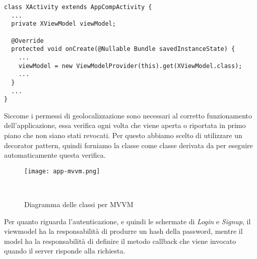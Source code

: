 \documentclass[../../manuale-sviluppatore.tex]{subfiles}
\begin{document}
\begin{verbatim}
class XActivity extends AppCompActivity {
  ...
  private XViewModel viewModel;

  @Override
  protected void onCreate(@Nullable Bundle savedInstanceState) {
    ...
    viewModel = new ViewModelProvider(this).get(XViewModel.class);
    ...
  }
  ...
}
\end{verbatim}

Siccome i permessi di geolocalizzazione sono necessari al corretto funzionamento dell'applicazione, essa verifica ogni volta che viene aperta o riportata in primo piano che non siano stati revocati.
Per questo abbiamo scelto di utilizzare un decorator pattern, quindi forniamo la classe  come classe derivata da  per eseguire automaticamente questa verifica.

\begin{figure}[h]
  \centering
  \texttt{[image: app-mvvm.png]}
  \caption{Diagramma delle classi per MVVM}
~~\label{fig:app/diagramma_classi_mvvm}
\end{figure}

Per quanto riguarda l'autenticazione, e quindi le schermate di \textit{Login} e \textit{Signup}, il viewmodel ha la responsabilità di produrre un hash della password, mentre il model ha la responsabilità di definire il metodo callback che viene invocato quando il server risponde alla richiesta.
\end{document}
